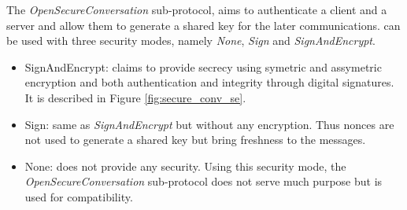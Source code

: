 \newcommand{\gereq}{GEReq}
\newcommand{\geres}{GERes}
\newcommand{\oscreq}{OSCReq}
\newcommand{\oscres}{OSCRes}


The {\em OpenSecureConversation} sub-protocol, aims to authenticate a client and
a server and allow them to generate a shared key for the later communications.
\opcua can be used with three security modes, namely {\em None}, {\em Sign} and
{\em SignAndEncrypt}.

\begin{itemize}
    \item SignAndEncrypt: claims to provide secrecy using symetric and
    assymetric encryption and both authentication and integrity through digital
    signatures.
    It is described in Figure \ref{fig:secure_conv_se}.

    \item Sign: same as {\em SignAndEncrypt} but without any encryption.
    Thus nonces are not used to generate a shared key but bring freshness to the
    messages.

    \item None: does not provide any security.
    Using this security mode, the {\em OpenSecureConversation} sub-protocol does
    not serve much purpose but is used for compatibility.
\end{itemize}

